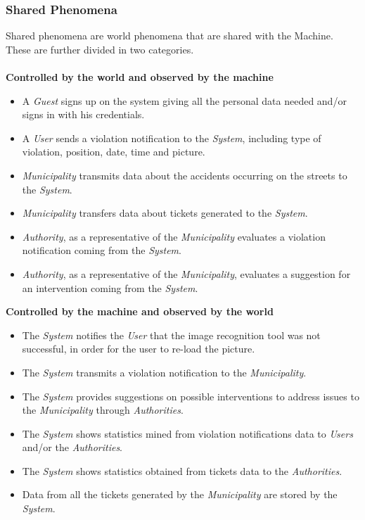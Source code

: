 \documentclass {article}
\begin{document}
		\subsubsection{Shared Phenomena}
		Shared phenomena are world phenomena that are shared with the Machine. These are further divided in two categories.\\ \\
		{\bf Controlled by the world and observed by the machine}
		\begin{itemize}
			\item A {\it Guest} signs up on the system giving all the personal data needed and/or signs in with his credentials.
			\item A {\it User} sends a violation notification to the {\it System}, including type of violation, position, date, time and picture.
			\item {\it Municipality} transmits data about the accidents occurring on the streets to the {\it System}.
			\item {\it Municipality} transfers data about tickets generated to the {\it System}.
			\item {\it Authority}, as a representative of the {\it Municipality} evaluates a violation notification coming from the {\it System}. 
			\item {\it Authority}, as a representative of the {\it Municipality}, evaluates a suggestion for an intervention coming from the {\it System}. 
		\end{itemize} 
		{\bf Controlled by the machine and observed by the world}
		\begin{itemize}
			\item The {\it System} notifies the {\it User} that the image recognition tool was not successful, in order for the user to re-load the picture.
			\item The {\it System} transmits a violation notification to the {\it Municipality}.
			\item The {\it System} provides suggestions on possible interventions to address issues to the {\it Municipality} through {\it Authorities}.
			\item The {\it System} shows statistics mined from violation notifications data to {\it Users} and/or the {\it Authorities}.
			\item The {\it System} shows statistics obtained from tickets data to the {\it Authorities}.
			\item Data from all the tickets generated by the {\it Municipality} are stored by the {\it System}.
		\end{itemize}	
\end{document}
